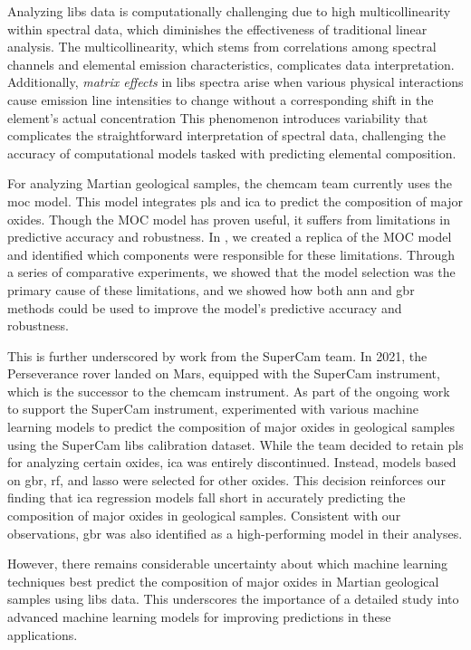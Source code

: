 Analyzing \gls{libs} data is computationally challenging due to high multicollinearity within spectral data, which diminishes the effectiveness of traditional linear analysis.
The multicollinearity, which stems from correlations among spectral channels and elemental emission characteristics, complicates data interpretation.
Additionally, \textit{matrix effects} in \gls{libs} spectra arise when various physical interactions cause emission line intensities to change without a corresponding shift in the element's actual concentration
This phenomenon introduces variability that complicates the straightforward interpretation of spectral data, challenging the accuracy of computational models tasked with predicting elemental composition.\cite{andersonImprovedAccuracyQuantitative2017}

For analyzing Martian geological samples, the \gls{chemcam} team currently uses the \gls{moc} model\cite{cleggRecalibrationMarsScience2017}.
This model integrates \gls{pls} and \gls{ica} to predict the composition of major oxides.
Though the MOC model has proven useful, it suffers from limitations in predictive accuracy and robustness.
In \citet{p9_paper}, we created a replica of the MOC model and identified which components were responsible for these limitations.
Through a series of comparative experiments, we showed that the model selection was the primary cause of these limitations, and we showed how both \gls{ann} and \gls{gbr} methods could be used to improve the model's predictive accuracy and robustness.

This is further underscored by work from the SuperCam team.
In 2021, the Perseverance rover landed on Mars, equipped with the SuperCam instrument, which is the successor to the \gls{chemcam} instrument.
As part of the ongoing work to support the SuperCam instrument, \citet{andersonPostlandingMajorElement2022} experimented with various machine learning models to predict the composition of major oxides in geological samples using the SuperCam \gls{libs} calibration dataset.
While the team decided to retain \gls{pls} for analyzing certain oxides, \gls{ica} was entirely discontinued.
Instead, models based on \gls{gbr}, \gls{rf}, and \gls{lasso} were selected for other oxides.
This decision reinforces our finding that \gls{ica} regression models fall short in accurately predicting the composition of major oxides in geological samples.
Consistent with our observations, \gls{gbr} was also identified as a high-performing model in their analyses.

However, there remains considerable uncertainty about which machine learning techniques best predict the composition of major oxides in Martian geological samples using \gls{libs} data.
This underscores the importance of a detailed study into advanced machine learning models for improving predictions in these applications.

